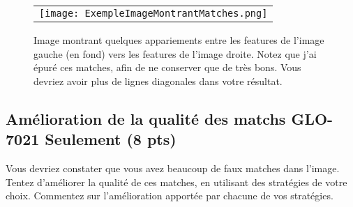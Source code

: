 \documentclass[12pt]{article}
\begin{document}
\begin{figure}[ht]
 \begin{center}
  \begin{tabular}{c}
    \texttt{[image: ExempleImageMontrantMatches.png]} 
  \end{tabular}
 \end{center}
\vspace{-0.25in}
 \caption{Image montrant quelques appariements entre les features de l'image gauche (en fond) vers les features de l'image droite. Notez que j'ai épuré ces matches, afin de ne conserver que de très bons. Vous devriez avoir plus de lignes diagonales dans votre résultat.}
 \label{ExempleImageMontrantMatches}
\end{figure}

\subsection{Amélioration de la qualité des matchs GLO-7021 Seulement (8 pts)}
Vous devriez constater que vous avez beaucoup de faux matches dans l'image. Tentez d'améliorer la qualité de ces matches, en utilisant des stratégies de votre choix. Commentez sur l'amélioration apportée par chacune de vos stratégies.
\end{document}
